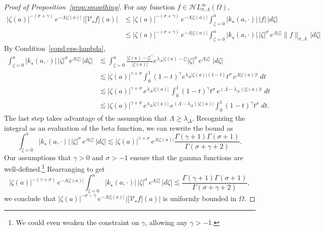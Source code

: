 \documentclass{article}
\theoremstyle{definition}
\theoremstyle{plain}
\newcommand{\singexp}[2]{\mathcal{H}L^\infty_{#1, #2}}
\newcommand{\softpart}{\mathcal{V}_\star}
\newcommand{\softker}{k_\star}
\newcommand{\domain}{\Omega}
\begin{document}
\begin{proof}[Proof of Proposition~\ref{prop:smoothing}]
For any function $f\in\singexp{\sigma}{\Lambda}(\domain)$,
\begin{align*}
|\zeta(a)|^{-(\sigma+\gamma)} \, e^{-\Lambda |\zeta(a)|} \, \Big \vert \big[ \softpart f\big](a)\Big\vert
&\leq |\zeta(a)|^{-(\sigma+\gamma)}\, e^{-\Lambda |\zeta(a)|} \int_{\zeta=0}^a |\softker(a,\cdot)|\, |f| \, |d\zeta| \\
&\leq |\zeta(a)|^{-(\sigma+\gamma)}\, e^{-\Lambda |\zeta(a)|} \int_{\zeta=0}^a |\softker(a,\cdot)|\, |\zeta|^{\sigma}\, e^{\Lambda |\zeta|} \|f\|_{\sigma,\Lambda} \, |d\zeta| 
\end{align*}
By Condition~\eqref{cond:eps-lambda},
\begin{align*}
\int_{\zeta=0}^a |\softker(a,\cdot)|\, |\zeta|^{\sigma}\, e^{\Lambda |\zeta|} \, |d\zeta| &\lesssim \int_{\zeta=0}^a \frac{|\zeta(a)-\zeta|^\gamma}{|\zeta(a)|} e^{\lambda_\Delta |\zeta(a)-\zeta|} |\zeta|^{\sigma}\, e^{\Lambda|\zeta|}\;|d\zeta|\\
&\lesssim |\zeta(a)|^{\gamma+\sigma} \int_{0}^1 (1-t)^\gamma e^{\lambda_\Delta |\zeta(a)|(1-t)} t^{\sigma}\, e^{\Lambda|\zeta(a)| t}\;dt\\
&\lesssim |\zeta(a)|^{\gamma+\sigma}\, e^{\lambda_\Delta |\zeta(a)|}\,  \int_{0}^1 (1-t)^\gamma  t^{\sigma}\,e^{(\Lambda-\lambda_\Delta)|\zeta(a)| t}\;dt\\
&\lesssim |\zeta(a)|^{\gamma+\sigma}\, e^{\lambda_\Delta |\zeta(a)|}\,e^{(\Lambda-\lambda_\Delta)|\zeta(a)|}\int_{0}^1 (1-t)^\gamma  t^{\sigma}\;dt.
\end{align*}
The last step takes advantage of the assumption that $\Lambda \ge \lambda_\Delta$. Recognizing the integral as an evaluation of the beta function, we can rewrite the bound as
\[ \int_{\zeta=0}^a |\softker(a,\cdot)|\, |\zeta|^{\sigma}\, e^{\Lambda |\zeta|} \, |d\zeta| \lesssim |\zeta(a)|^{\gamma+\sigma}\, e^{\Lambda |\zeta(a)|} \frac{\Gamma(\gamma+1)\Gamma(\sigma+1)}{\Gamma(\sigma+\gamma+2)}. \]
Our assumptions that $\gamma > 0$ and $\sigma > -1$ ensure that the gamma functions are well-defined.\footnote{We could even weaken the constraint on $\gamma$, allowing any $\gamma > -1$.} Rearranging to get
\[ |\zeta(a)|^{-(\gamma+\sigma)}\, e^{-\Lambda |\zeta(a)|} \int_{\zeta=0}^a |\softker(a,\cdot)|\, |\zeta|^{\sigma}\, e^{\Lambda |\zeta|} \, |d\zeta| \lesssim \frac{\Gamma(\gamma+1)\Gamma(\sigma+1)}{\Gamma(\sigma+\gamma+2)}, \]
we conclude that $|\zeta(a)|^{-\sigma-\gamma} \, e^{-\Lambda |\zeta(a)|} \, \Big \vert \big[ \softpart f\big](a)\Big\vert$ is uniformly bounded in $\domain$. 
\end{proof}
\end{document}
